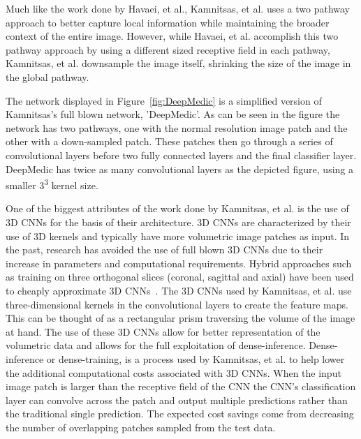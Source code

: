 \documentclass{sig-alternate}
\begin{document}
Much like the work done by Havaei, et al., Kamnitsas, et al. uses a two pathway approach to better capture local information while maintaining the broader context of the entire image. However, while Havaei, et al. accomplish this two pathway approach by using a different sized receptive field in each pathway, Kamnitsas, et al. downsample the image itself, shrinking the size of the image in the global pathway.


\begin{figure*}
\centering
{}
\caption{The basic neural network architecture, `Deep Medic', used by Kamnitsas, et al. Adapted from~\cite{Kamnitsas:2017}.}
\label{fig:DeepMedic}
\end{figure*}

The network displayed in Figure~\ref{fig:DeepMedic} is a simplified version of Kamnitsas's full blown network, 'DeepMedic'. As can be seen in the figure the network has two pathways, one with the normal resolution image patch and the other with a down-sampled patch. These patches then go through a series of convolutional layers before two fully connected layers and the final classifier layer. DeepMedic has twice as many convolutional layers as the depicted figure, using a smaller 3\textsuperscript{3} kernel size.

One of the biggest attributes of the work done by Kamnitsas, et al. is the use of 3D CNNs for the basis of their architecture. 3D CNNs are characterized by their use of 3D kernels and typically have more volumetric image patches as input. In the past, research has avoided the use of full blown 3D CNNs due to their increase in parameters and computational requirements.  Hybrid approaches such as training on three orthogonal slices (coronal, sagittal and axial) have been used to cheaply approximate 3D CNNs~\cite{Roth:2014}. The 3D CNNs used by Kamnitsas, et al. use three-dimensional kernels in the convolutional layers to create the feature maps. This can be thought of as a rectangular prism traversing the volume of the image at hand. The use of these 3D CNNs allow for better representation of the volumetric data and allows for the full exploitation of dense-inference. Dense-inference or dense-training, is a process used by Kamnitsas, et al. to help lower the additional computational costs associated with 3D CNNs. When the input image patch is larger than the receptive field of the CNN the CNN's classification layer can convolve across the patch and output multiple predictions rather than the traditional single prediction. The expected cost savings come from decreasing the number of overlapping patches sampled from the test data.
\end{document}
